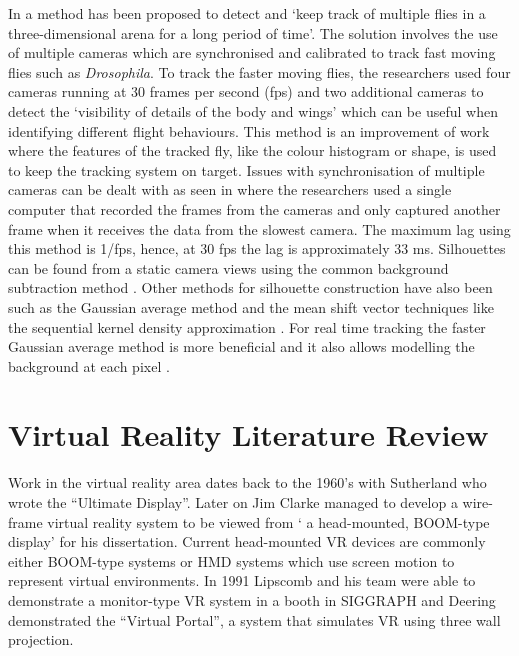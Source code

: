 In \cite{ardekani2012three} a method has been proposed to detect and \lq keep track of multiple flies in a three-dimensional arena for a long period of time\rq. The solution involves the use of multiple cameras which are synchronised and calibrated to track fast moving flies such as \textit{Drosophila}. To track the faster moving flies, the researchers used four cameras running at 30 frames per second (fps) and two additional cameras to detect the \lq visibility of details of the body and wings'  which can be useful when identifying different flight behaviours. This method is an improvement of \cite{kuo2010multi, zhou2004visual} work where the features of the tracked fly, like the colour histogram or shape, is used to keep the tracking system on target. Issues with synchronisation of multiple cameras can be dealt with as seen in \cite{ardekani2012three} where the researchers used a single computer that recorded the frames from the cameras and only captured another frame when it receives the data from the slowest camera. The maximum lag using this method is 1/fps, hence, at 30 fps the lag is approximately 33 ms. Silhouettes can be found from a static camera views using the common background subtraction method \cite{piccardi2004background}. Other methods for silhouette construction have also been such as the Gaussian average method and the mean shift vector techniques like the sequential kernel density approximation \cite{piccardi2004background}. For real time tracking the faster Gaussian average method is more beneficial and it also allows modelling the background at each pixel \cite{ardekani2012three}. 

\section{Virtual Reality Literature Review}

Work in the virtual reality area dates back to the 1960's with Sutherland \cite{sutherland1965ultimate} who wrote the ``Ultimate Display''. Later on Jim Clarke managed to develop a wire-frame virtual reality system to be viewed from ` a head-mounted, BOOM-type display'\cite{cruz1993surround} for his dissertation. Current head-mounted VR devices are commonly either BOOM-type systems \cite{mcdowall1990implementation} or HMD systems \cite{teitel1990eyephone, fisher1987virtual} which use screen motion to represent virtual environments. In 1991 Lipscomb \cite{codella1992interactive} and his team were able to demonstrate a monitor-type VR system in a booth in SIGGRAPH and Deering \cite{deering1992high} demonstrated the ``Virtual Portal'', a system that simulates VR using three wall projection. 


